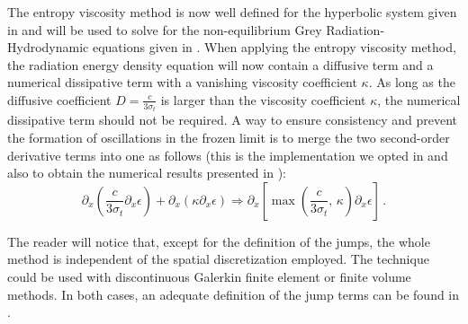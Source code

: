 \documentclass[times,doublespace]{fldauth}%
\begin{document}
The entropy viscosity method is now well defined for the hyperbolic system given in  and will be used to solve for the non-equilibrium Grey Radiation-Hydrodynamic equations given in . 
When applying the entropy viscosity method, the radiation energy density equation will now contain a diffusive term and a numerical dissipative term with a vanishing viscosity coefficient $\kappa$. As long as the diffusive coefficient $D=\frac{c}{3 \sigma_t}$ is larger than the viscosity coefficient $\kappa$, the numerical dissipative term should not be required. A way to ensure consistency and prevent the formation of oscillations in the frozen limit is to merge the two second-order derivative terms into one as follows (this is the implementation we opted in \cite{our_jcp_radhy_paper} and also to obtain the numerical results presented in ):
%
\begin{equation}
 \partial_x \left( \frac{c}{3 \sigma_t} \partial_x \epsilon \right) + \partial_x \left( \kappa \partial_x \epsilon \right) 
 \Longrightarrow
 \partial_x \left[ \max\left(\frac{c}{3 \sigma_t} \text{, } \kappa \right) \partial_x \epsilon \right] \,.
\end{equation}
%
%
 \begin{remark}
The reader will notice that, except for the definition of the jumps, the whole method is independent of the spatial discretization employed. The technique could be used with discontinuous Galerkin finite element or finite volume methods. In both cases, an adequate  definition of the jump terms can be found in \cite{valentin}.
 \end{remark}
%
\end{document}
